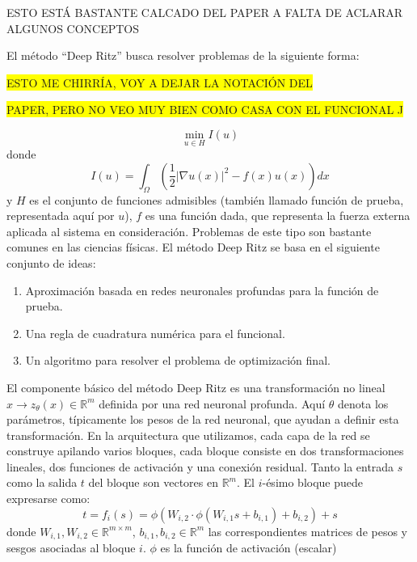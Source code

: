 \documentclass[a4paper,11pt,spanish, twoside, leqno]{tfg-uam}
\theoremstyle{definition}
\begin{document}
ESTO ESTÁ BASTANTE CALCADO DEL PAPER A FALTA DE ACLARAR ALGUNOS CONCEPTOS

El método ``Deep Ritz'' busca resolver problemas de la siguiente forma:

\colorbox{yellow}{ESTO ME CHIRRÍA, VOY A DEJAR LA NOTACIÓN DEL}

\colorbox{yellow}{PAPER, PERO NO VEO MUY BIEN COMO CASA CON EL FUNCIONAL J}

\begin{equation}
\min_{u \in H} I(u)
\end{equation}
donde
\begin{equation}
I(u) = \int_{\Omega} \left( \frac 12  |\nabla u(x)|^2 -  f(x) u(x) \right) dx
\label{I(u)}
\end{equation}
y $H$ es el conjunto de funciones admisibles (también llamado función de prueba, representada aquí por $u$), $f$ es una función dada, que representa la fuerza externa aplicada al sistema en consideración. Problemas de este tipo son bastante comunes en las ciencias físicas. El método Deep Ritz se basa en el siguiente conjunto de ideas:

\begin{enumerate}
\item Aproximación basada en redes neuronales profundas para la función de prueba.
\item Una regla de cuadratura numérica para el funcional.
\item Un algoritmo para resolver el problema de optimización final.
\end{enumerate}


El componente básico del método Deep Ritz es una transformación no lineal $ x \rightarrow z_\theta (x)\in \mathbb{R}^{m} $ definida por una red neuronal profunda. Aquí $\theta$ denota los parámetros, típicamente los pesos de la red neuronal, que ayudan a definir esta transformación. En la arquitectura que utilizamos, cada capa de la red se construye apilando varios bloques, cada bloque consiste en dos transformaciones lineales, dos funciones de activación y una conexión residual. Tanto la entrada $s$ como la salida $t$ del bloque son vectores en $\mathbb{R}^{m}$. El $i$-ésimo bloque puede expresarse como:
\begin{equation}
t=f_i(s)=\phi(W_{i,2} \cdot \phi(W_{i,1} s +b_{i,1})+b_{i,2})+s
\label{block}
\end{equation}
donde $W_{i,1},W_{i,2} \in \mathbb{R}^{m \times m}$, $b_{i,1},b_{i,2} \in \mathbb{R}^{m}$ las correspondientes matrices de pesos y sesgos asociadas al bloque $i$. $\phi$ es la función de activación (escalar)
\end{document}

